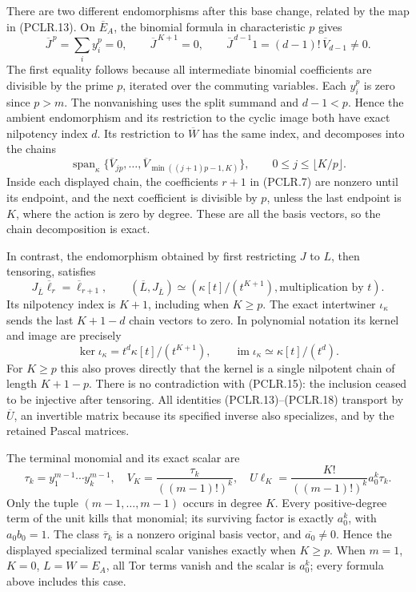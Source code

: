There are two different endomorphisms after this base change,
related by the map in (PCLR.13). On \(\overline E_A\), the binomial
formula in characteristic \(p\) gives
\[
 \overline J^{\,p}=\sum_i y_i^p=0,
 \qquad\overline J^{\,K+1}=0,
 \qquad \overline J^{\,d-1}1=(d-1)!\,\overline V_{d-1}\ne0.
 \tag{PCLR.15}
\]
The first equality follows because all intermediate binomial
coefficients are divisible by the prime \(p\), iterated over
the commuting variables. Each \(y_i^p\) is zero since \(p>m\).
The nonvanishing uses the split summand and \(d-1<p\). Hence the
ambient endomorphism and its restriction to the cyclic image
both have exact nilpotency index \(d\). Its restriction to
\(\overline W\) has the same index, and decomposes into the chains
\[
 \operatorname{span}_\kappa
  \{\overline V_{jp},\ldots,
     \overline V_{\min((j+1)p-1,K)}\},
 \qquad 0\leq j\leq\lfloor K/p\rfloor.
 \tag{PCLR.16}
\]
Inside each displayed chain, the coefficients \(r+1\) in
(PCLR.7) are nonzero until its endpoint, and the next coefficient
is divisible by \(p\), unless the last endpoint is \(K\), where
the action is zero by degree. These are all the basis vectors,
so the chain decomposition is exact.

In contrast, the endomorphism obtained by first restricting
\(J\) to \(L\), then tensoring, satisfies
\[
 J_{\overline L}\overline\ell_r=\overline\ell_{r+1},\qquad
 (\overline L,J_{\overline L})\simeq
           (\kappa[t]/(t^{K+1}),\text{multiplication by }t).
 \tag{PCLR.17}
\]
Its nilpotency index is \(K+1\), including when \(K\geq p\).
The exact intertwiner \(\iota_\kappa\) sends the last \(K+1-d\)
chain vectors to zero. In polynomial notation its kernel and
image are precisely
\[
 \ker\iota_\kappa=t^d\kappa[t]/(t^{K+1}),\qquad
 \operatorname{im}\iota_\kappa\simeq\kappa[t]/(t^d).
 \tag{PCLR.18}
\]
For \(K\geq p\) this also proves directly that the kernel is a
single nilpotent chain of length \(K+1-p\). There is no
contradiction with (PCLR.15): the inclusion ceased to be
injective after tensoring. All identities (PCLR.13)--(PCLR.18)
transport by \(\overline U\), an invertible matrix because its
specified inverse also specializes, and by the retained Pascal
matrices.

The terminal monomial and its exact scalar are
\[
 \tau_k=y_1^{m-1}\cdots y_k^{m-1},\quad
 V_K=\frac{\tau_k}{((m-1)!)^k},\quad
 U\ell_K=\frac{K!}{((m-1)!)^k}a_0^k\tau_k.
 \tag{PCLR.19}
\]
Only the tuple \((m-1,\ldots,m-1)\) occurs in degree \(K\).
Every positive-degree term of the unit kills that monomial;
its surviving factor is exactly \(a_0^k\), with
\(a_0b_0=1\). The class \(\overline\tau_k\) is a nonzero original
basis vector, and \(\overline{a_0}\ne0\). Hence the displayed
specialized terminal scalar vanishes exactly when \(K\geq p\).
When \(m=1\), \(K=0\), \(L=W=E_A\), all Tor terms vanish and
the scalar is \(a_0^k\); every formula above includes this case.

